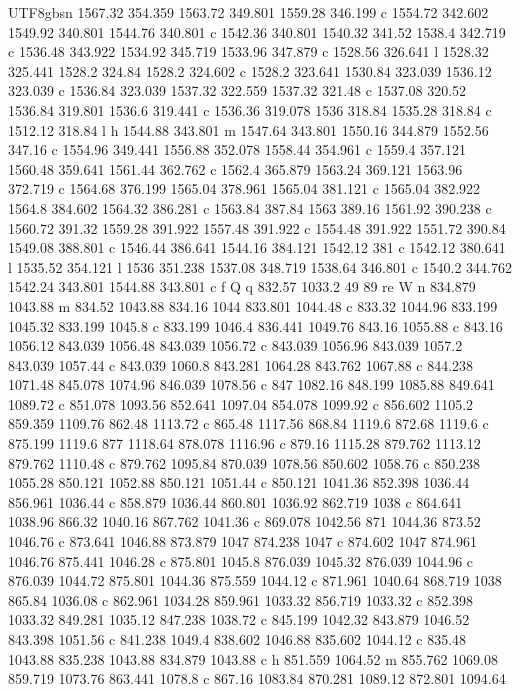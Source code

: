 \documentclass[11pt,a4paper,oneside]{report}
\begin{document}
\begin{CJK*}{UTF8}{gbsn}
{1567.32 354.359 1563.72 349.801 1559.28 346.199 c 1554.72 342.602 1549.92 340.801 1544.76 340.801 c
1542.36 340.801 1540.32 341.52 1538.4 342.719 c 1536.48 343.922 1534.92 345.719 1533.96 347.879 c 1528.56
326.641 l 1528.32 325.441 1528.2 324.84 1528.2 324.602 c 1528.2 323.641 1530.84 323.039 1536.12 323.039 c
1536.84 323.039 1537.32 322.559 1537.32 321.48 c 1537.08 320.52 1536.84 319.801 1536.6 319.441 c 1536.36
319.078 1536 318.84 1535.28 318.84 c 1512.12 318.84 l h 1544.88 343.801 m 1547.64 343.801 1550.16 344.879
1552.56 347.16 c 1554.96 349.441 1556.88 352.078 1558.44 354.961 c 1559.4 357.121 1560.48 359.641 1561.44
362.762 c 1562.4 365.879 1563.24 369.121 1563.96 372.719 c 1564.68 376.199 1565.04 378.961 1565.04
381.121 c 1565.04 382.922 1564.8 384.602 1564.32 386.281 c 1563.84 387.84 1563 389.16 1561.92 390.238 c
1560.72 391.32 1559.28 391.922 1557.48 391.922 c 1554.48 391.922 1551.72 390.84 1549.08 388.801 c 1546.44
386.641 1544.16 384.121 1542.12 381 c 1542.12 380.641 l 1535.52 354.121 l 1536 351.238 1537.08 348.719
1538.64 346.801 c 1540.2 344.762 1542.24 343.801 1544.88 343.801 c f Q q 832.57 1033.2 49 89 re W n
834.879 1043.88 m 834.52 1043.88 834.16 1044 833.801 1044.48 c 833.32 1044.96 833.199 1045.32 833.199
1045.8 c 833.199 1046.4 836.441 1049.76 843.16 1055.88 c 843.16 1056.12 843.039 1056.48 843.039 1056.72 c
843.039 1056.96 843.039 1057.2 843.039 1057.44 c 843.039 1060.8 843.281 1064.28 843.762 1067.88 c 844.238
1071.48 845.078 1074.96 846.039 1078.56 c 847 1082.16 848.199 1085.88 849.641 1089.72 c 851.078 1093.56
852.641 1097.04 854.078 1099.92 c 856.602 1105.2 859.359 1109.76 862.48 1113.72 c 865.48 1117.56 868.84
1119.6 872.68 1119.6 c 875.199 1119.6 877 1118.64 878.078 1116.96 c 879.16 1115.28 879.762 1113.12
879.762 1110.48 c 879.762 1095.84 870.039 1078.56 850.602 1058.76 c 850.238 1055.28 850.121 1052.88
850.121 1051.44 c 850.121 1041.36 852.398 1036.44 856.961 1036.44 c 858.879 1036.44 860.801 1036.92
862.719 1038 c 864.641 1038.96 866.32 1040.16 867.762 1041.36 c 869.078 1042.56 871 1044.36 873.52
1046.76 c 873.641 1046.88 873.879 1047 874.238 1047 c 874.602 1047 874.961 1046.76 875.441 1046.28 c
875.801 1045.8 876.039 1045.32 876.039 1044.96 c 876.039 1044.72 875.801 1044.36 875.559 1044.12 c
871.961 1040.64 868.719 1038 865.84 1036.08 c 862.961 1034.28 859.961 1033.32 856.719 1033.32 c 852.398
1033.32 849.281 1035.12 847.238 1038.72 c 845.199 1042.32 843.879 1046.52 843.398 1051.56 c 841.238
1049.4 838.602 1046.88 835.602 1044.12 c 835.48 1043.88 835.238 1043.88 834.879 1043.88 c h 851.559
1064.52 m 855.762 1069.08 859.719 1073.76 863.441 1078.8 c 867.16 1083.84 870.281 1089.12 872.801 1094.64
}
\end{CJK*}
\end{document}
